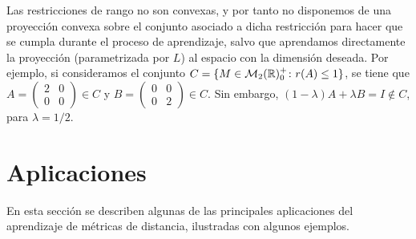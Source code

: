     \begin{example}
        Las restricciones de rango no son convexas, y por tanto no disponemos de una proyección convexa sobre el conjunto asociado a dicha restricción para hacer que se cumpla durante el proceso de aprendizaje, salvo que aprendamos directamente la proyección (parametrizada por $L$)  al espacio con la dimensión deseada. Por ejemplo, si consideramos el conjunto $C = \{ M \in \mathcal{M}_2(\mathbb{R})^+_0 \colon r(A) \le 1 \}$, se tiene que $A = \begin{pmatrix} 2 & 0 \\ 0 & 0 \end{pmatrix} \in C$ y $B = \begin{pmatrix} 0 & 0 \\ 0 & 2 \end{pmatrix} \in C$. Sin embargo, $(1-\lambda)A+\lambda B = I \notin C$, para $\lambda=1/2$. 
    \end{example}

\section{Aplicaciones} \label{section:aplicaciones}

En esta sección se describen algunas de las principales aplicaciones del aprendizaje de métricas de distancia, ilustradas con algunos ejemplos.



